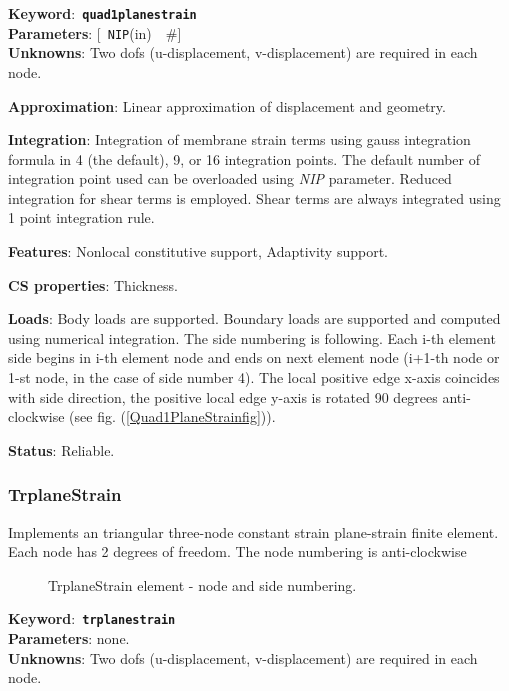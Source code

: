 \documentclass[a4paper]{article}
\newcommand{\descitem}[1]{{\noindent \bf #1}:}
\newcommand{\elemkeyword}[1]{\descitem{Keyword}~{\bf \texttt{#1}}}
\newcommand{\elemparam}[2]{{{\texttt{#1}\tiny (#2)}~~\#}}
\newcommand{\optelemparam}[2]{{[~\elemparam{#1}{#2}]}}
\newcommand{\param}[1]{{\em #1}}
\begin{document}
\elemkeyword{quad1planestrain}\\
\descitem{Parameters} \optelemparam{NIP}{in}\\
\descitem{Unknowns}
Two dofs (u-displacement, v-displacement) are required in each node.

\descitem{Approximation} Linear approximation of displacement and
geometry.

\descitem{Integration}
Integration of membrane strain terms using gauss integration formula
in 4 (the default), 9, or 16 integration points. The default number of
integration point used can be overloaded using \param{NIP} parameter.
Reduced integration for shear terms is employed. Shear terms are
always integrated using 1 point integration rule.

\descitem{Features} Nonlocal constitutive support, Adaptivity support.

\descitem{CS properties} Thickness. 

\descitem{Loads} Body loads are supported. Boundary loads are
supported and computed using numerical integration. The side numbering is
following. Each i-th element side begins in i-th element node and
ends on next element node (i+1-th node or 1-st node, in the case of 
side number 4). The local positive edge x-axis coincides with side
direction, the positive local edge y-axis is rotated 90 degrees
anti-clockwise (see fig. (\ref{Quad1PlaneStrainfig})).

\descitem{Status} Reliable.


\subsubsection{TrplaneStrain}
Implements an triangular three-node  constant strain plane-strain  
finite element. Each node has 2 degrees of freedom.
The node numbering is anti-clockwise

\begin{figure}[htb]
 \centering
 \begin{makeimage}
 \end{makeimage}
 \caption{TrplaneStrain element - node and side numbering.}
 \label{TrplaneStrain}
\end{figure}

\elemkeyword{trplanestrain}\\
\descitem{Parameters} none.\\
\descitem{Unknowns}
Two dofs (u-displacement, v-displacement) are required in each node.
\end{document}
